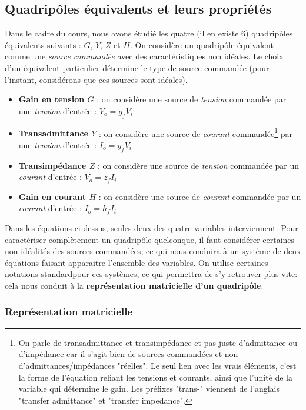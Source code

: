 \subsection{Quadripôles équivalents et leurs propriétés}
Dans le cadre du cours, nous avons étudié les quatre (il en existe 6) quadripôles équivalents suivants : $G$, $Y$, $Z$ et $H$. On considère un quadripôle équivalent comme une \textit{source commandée} avec des caractéristiques non idéales. Le choix d'un équivalent particulier détermine le type de source commandée (pour l'instant, considérons que ces sources sont idéales).
\begin{itemize}
\item \textbf{Gain en tension $G$} : on considère une source de \textit{tension} commandée par une \textit{tension} d'entrée : $V_o = g_f V_i$
\item \textbf{Transadmittance $Y$} : on considère une source de \textit{courant} commandée\footnote{On parle de transadmittance et transimpédance et pas juste d'admittance ou d'impédance car il s'agit bien de sources commandées et non d'admittances/impédances "réelles". Le seul lien avec les vrais éléments, c'est la forme de l'équation reliant les tensions et courants, ainsi que l'unité de la variable qui détermine le gain. Les préfixes "trans-" viennent de l'anglais "transfer admittance" et "transfer impedance".} par une \textit{tension} d'entrée : $I_o = y_f V_i$
\item \textbf{Transimpédance $Z$} : on considère une source de \textit{tension} commandée par un \textit{courant} d'entrée : $V_o = z_f I_i$
\item \textbf{Gain en courant $H$} : on considère une source de \textit{courant} commandée par un \textit{courant} d'entrée : $I_o = h_f I_i$
\end{itemize}


Dans les équations ci-dessus, seules deux des quatre variables interviennent. Pour caractériser complètement un quadripôle quelconque, il faut considérer certaines non idéalités des sources commandées, ce qui nous conduira à un système de deux équations faisant apparaitre l'ensemble des variables. On utilise certaines notations \og standard\fg  pour ces systèmes, ce qui permettra de s'y retrouver plus vite: cela nous conduit à la \textbf{représentation matricielle d'un quadripôle}.

\subsubsection*{Représentation matricielle}

